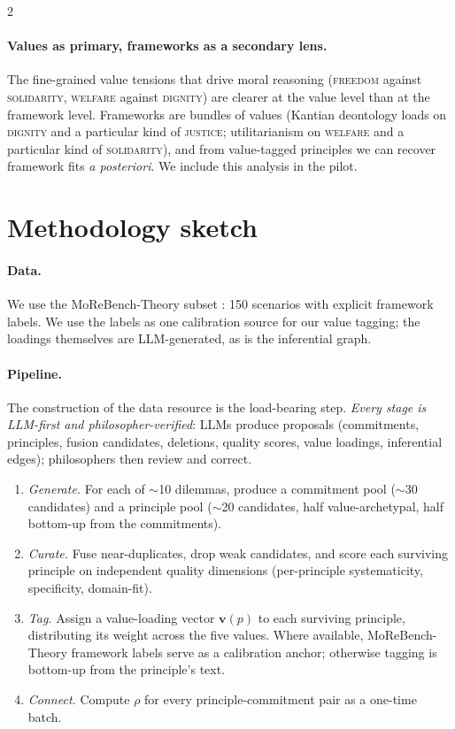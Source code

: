 \documentclass[10pt]{article}
\begin{document}
\begin{multicols}{2}
\paragraph{Values as primary, frameworks as a secondary lens.} The
fine-grained value tensions that drive moral reasoning
(\textsc{freedom} against \textsc{solidarity}, \textsc{welfare} against
\textsc{dignity}) are clearer at the value level than at the framework
level. Frameworks are bundles of values (Kantian deontology loads on
\textsc{dignity} and a particular kind of \textsc{justice}; utilitarianism on
\textsc{welfare} and a particular kind of \textsc{solidarity}), and from
value-tagged principles we can recover framework fits \emph{a posteriori}.
We include this analysis in the pilot.

\section{Methodology sketch}\label{sec:methods}

\paragraph{Data.} We use the MoReBench-Theory subset
\citep{morebench2025}: 150 scenarios with explicit framework labels. We use
the labels as one calibration source for our value tagging; the loadings
themselves are LLM-generated, as is the inferential graph.

\paragraph{Pipeline.} The construction of the data resource is the
load-bearing step. \emph{Every stage is LLM-first and philosopher-verified}:
LLMs produce proposals (commitments, principles, fusion candidates,
deletions, quality scores, value loadings, inferential edges); philosophers
then review and correct.
\begin{enumerate}[leftmargin=*, itemsep=2pt, label=(\roman*)]
  \item \emph{Generate.} For each of $\sim$10 dilemmas, produce a commitment
    pool ($\sim$30 candidates) and a principle pool ($\sim$20 candidates,
    half value-archetypal, half bottom-up from the commitments).
  \item \emph{Curate.} Fuse near-duplicates, drop weak candidates, and score
    each surviving principle on independent quality dimensions (per-principle
    systematicity, specificity, domain-fit).
  \item \emph{Tag.} Assign a value-loading vector $\boldsymbol{v}(p)$ to each
    surviving principle, distributing its weight across the five values.
    Where available, MoReBench-Theory framework labels serve as a calibration
    anchor; otherwise tagging is bottom-up from the principle's text.
  \item \emph{Connect.} Compute $\rho$ for every principle-commitment pair
    as a one-time batch.
\end{enumerate}


\end{multicols}
\end{document}
